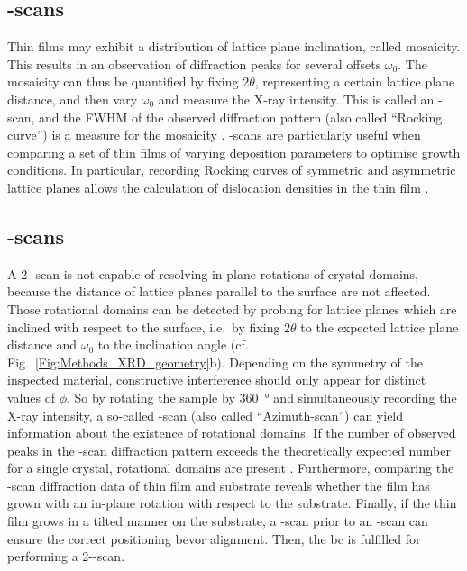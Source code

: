 \subsection{\textomega-scans}
    \label{Sec:Methods_omegaScan}
Thin films may exhibit a distribution of lattice plane inclination, called mosaicity.
This results in an observation of diffraction peaks for several offsets $\omega_0$.
The mosaicity can thus be quantified by fixing $2\theta$, representing a certain lattice plane distance, and then vary $\omega_0$ and measure the X-ray intensity.
This is called an \textomega-scan, and the \gls{FWHM} of the observed diffraction pattern (also called \enquote{Rocking curve}) is a measure for the mosaicity
    \cite{harrington2021}.
\textomega-scans are particularly useful when comparing a set of thin films of varying deposition parameters to optimise growth conditions.
In particular, recording Rocking curves of symmetric and asymmetric lattice planes allows the calculation of dislocation densities in the thin film
    \cite{srikant1997}.
\subsection{\textphi-scans}
    \label{Sec:Methods_phiScan}
A 2\texttheta-\textomega-scan is not capable of resolving in-plane rotations of crystal domains, because the distance of lattice planes parallel to the surface are not affected.
Those rotational domains can be detected by probing for lattice planes which are inclined with respect to the surface, i.e.\ by fixing $2\theta$ to the expected lattice plane distance and $\omega_0$ to the inclination angle (cf. Fig.~\ref{Fig:Methods_XRD_geometry}b).
Depending on the symmetry of the inspected material, constructive interference should only appear for distinct values of $\phi$.
So by rotating the sample by \qty{360}{\degree} and simultaneously recording the X-ray intensity, a so-called \textphi-scan (also called \enquote{Azimuth-scan}) can yield information about the existence of rotational domains.
If the number of observed peaks in the \textphi-scan diffraction pattern exceeds the theoretically expected number for a single crystal, rotational domains are present
    \cite{harrington2021}.
Furthermore, comparing the \textphi-scan diffraction data of thin film and substrate reveals whether the film has grown with an in-plane rotation with respect to the substrate.
Finally, if the thin film grows in a tilted manner on the substrate, a \textphi-scan prior to an \textomega-scan can ensure the correct positioning bevor alignment.
Then, the \gls{bc} is fulfilled for performing a 2\texttheta-\textomega-scan.

